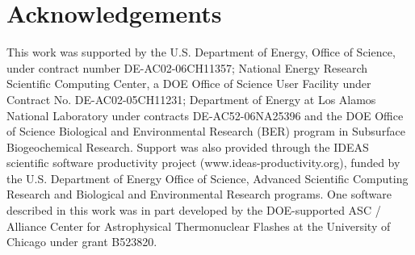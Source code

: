 \documentclass[sunil1]{sunil} %
\begin{document}
\section*{Acknowledgements}
This work was supported by the U.S. Department of
Energy, Office of Science, under contract number DE-AC02-06CH11357;  
National Energy Research Scientific Computing Center, a DOE Office
of Science User Facility under Contract No. DE-AC02-05CH11231;  
Department of Energy at Los Alamos National Laboratory under contracts
DE-AC52-06NA25396 and the DOE Office of Science Biological and
Environmental Research (BER) program in Subsurface Biogeochemical
Research. Support was also provided through the IDEAS
scientific software productivity project (www.ideas-productivity.org),
funded by the U.S. Department of Energy Office of Science, Advanced
Scientific Computing Research and Biological and Environmental
Research programs. One software described in this work was in part
developed by the DOE-supported ASC / Alliance Center for Astrophysical
Thermonuclear Flashes at the University of Chicago under grant B523820. 


\end{document}
